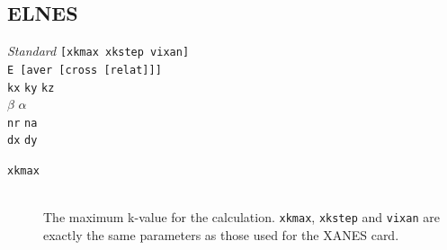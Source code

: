 \documentclass[11pt,oneside]{report} %
\renewcommand{\htmlref}[2]{\hyperlink{#2}{#1}}
\newenvironment{Card}[4]%
      {\vspace{3ex}%
        \subsection{#1}
        \quad\textsl{#3}\newline
        \quad\texttt{#2}\newline%
        \label{card:#4}\\}
      {}
\renewcommand{\htmlref}[2]{{#1}} %
\begin{document}
\begin{Card}{ELNES}{[xkmax xkstep vixan]}{Standard}{eln}
\texttt{E [aver [cross [relat]]]}\\%
\texttt{kx} \texttt{ky} \texttt{kz}\\%
$\mathtt{\beta}$ $\mathtt{\alpha}$\\%
\texttt{nr} \texttt{na}\\%
\texttt{dx} \texttt{dy}%

\begin{description}
  \item[\texttt{xkmax}]\hfill\\ 
    The maximum k-value for the calculation. \texttt{xkmax}, \texttt{xkstep} 
    and \texttt{vixan} are exactly the same parameters as those used for the 
    \htmlref{XANES}{card:xan} card.


\end{description}
\end{Card}
\end{document}
